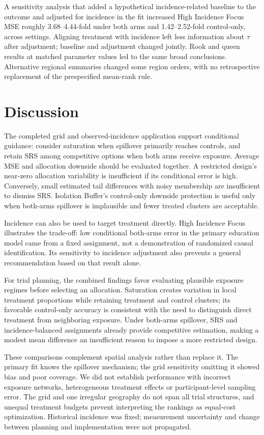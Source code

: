 \documentclass[Afour,sagev,times]{sagej}
\begin{document}
A sensitivity analysis that added a hypothetical incidence-related baseline to the outcome and adjusted for incidence in the fit increased High Incidence Focus MSE roughly 3.68--4.44-fold under both arms and 1.42--2.52-fold control-only, across settings. Aligning treatment with incidence left less information about $\tau$ after adjustment; baseline and adjustment changed jointly. Rook and queen results at matched parameter values led to the same broad conclusions. Alternative regional summaries changed some region orders, with no retrospective replacement of the prespecified mean-rank rule.

\section{Discussion}
The completed grid and observed-incidence application support conditional guidance: consider saturation when spillover primarily reaches controls, and retain SRS among competitive options when both arms receive exposure. Average MSE and allocation downside should be evaluated together. A restricted design's near-zero allocation variability is insufficient if its conditional error is high. Conversely, small estimated tail differences with noisy membership are insufficient to dismiss SRS. Isolation Buffer's control-only downside protection is useful only when both-arms spillover is implausible and fewer treated clusters are acceptable.

Incidence can also be used to target treatment directly. High Incidence Focus illustrates the trade-off: low conditional both-arms error in the primary education model came from a fixed assignment, not a demonstration of randomized causal identification. Its sensitivity to incidence adjustment also prevents a general recommendation based on that result alone.

For trial planning, the combined findings favor evaluating plausible exposure regimes before selecting an allocation. Saturation creates variation in local treatment proportions while retaining treatment and control clusters; its favorable control-only accuracy is consistent with the need to distinguish direct treatment from neighboring exposure. Under both-arms spillover, SRS and incidence-balanced assignments already provide competitive estimation, making a modest mean difference an insufficient reason to impose a more restricted design.

These comparisons complement spatial analysis rather than replace it. The primary fit knows the spillover mechanism; the grid sensitivity omitting it showed bias and poor coverage. We did not establish performance with incorrect exposure networks, heterogeneous treatment effects or participant-level sampling error. The grid and one irregular geography do not span all trial structures, and unequal treatment budgets prevent interpreting the rankings as equal-cost optimization. Historical incidence was fixed; measurement uncertainty and change between planning and implementation were not propagated.
\end{document}
